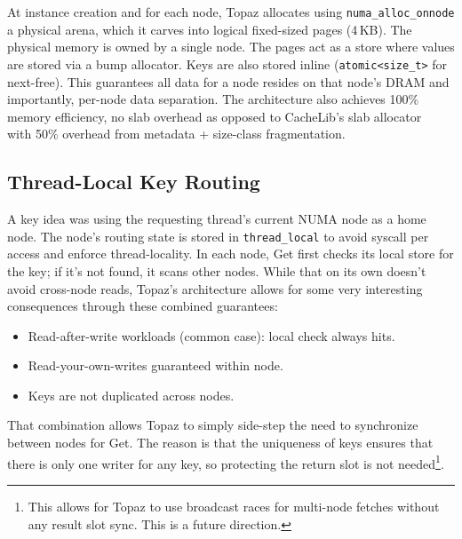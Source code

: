 \documentclass[sigplan,10pt]{acmart}
\begin{document}
%
At instance creation and for each node, Topaz allocates using \texttt{numa\_alloc\_onnode} a physical arena,
which it carves into logical fixed-sized pages (4\,KB). The physical memory is owned by a single node.
The pages act as a store where values are stored via a bump allocator. Keys are also stored inline (\texttt{atomic<size\_t>} for next-free).
This guarantees all data for a node resides on that node's DRAM and importantly, per-node data separation.
The architecture also achieves 100\% memory efficiency, no slab overhead as opposed to CacheLib's slab allocator~\cite{slab} with 50\% overhead from metadata + size-class fragmentation.
\subsection{Thread-Local Key Routing}

%
A key idea was using the requesting thread's current NUMA node as a home node.
The node's routing state is stored in \texttt{thread\_local} to avoid syscall per access
and enforce thread-locality. 
In each node, Get first checks its local store for the key; if it's not found, it scans other nodes.
While that on its own doesn't avoid cross-node reads, 
Topaz's architecture allows for some very interesting consequences through these combined guarantees: 
\begin{itemize}
  \item Read-after-write workloads (common case): local check always hits.
  \item Read-your-own-writes guaranteed within node.
  \item Keys are not duplicated across nodes.
\end{itemize}
That combination allows Topaz to simply side-step the need to synchronize between nodes for Get.
The reason is that the uniqueness of keys ensures that there is only one writer for any key, 
so protecting the return slot is not needed\footnote{This allows for Topaz to use broadcast races for multi-node fetches without any result slot sync. This is a future direction.}.
\end{document}
